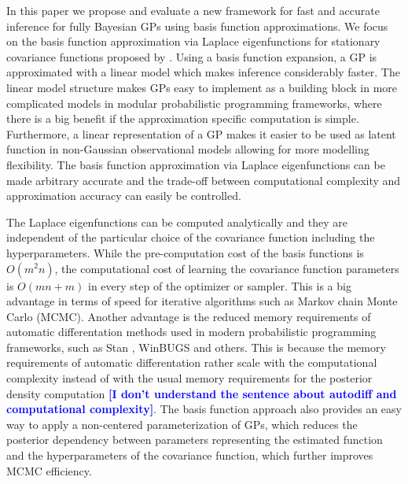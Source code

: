 \documentclass[onecolumn,a4paper,11pt]{article}
\newcommand{\todo}[1]{\textcolor{blue}{\textbf{[#1]}}}
\begin{document}
In this paper we propose and evaluate a new framework for fast and accurate inference for fully Bayesian GPs using basis function approximations. We focus on the basis function approximation via Laplace eigenfunctions for stationary covariance functions proposed by \citet{solin2018hilbert}. Using a basis function expansion, a GP is approximated with a linear model which makes inference considerably faster. The linear model structure makes GPs easy to implement as a building block in more complicated models in modular probabilistic programming frameworks, where there is a big benefit if the approximation specific computation is simple. Furthermore, a linear representation of a GP makes it easier to be used as latent function
in non-Gaussian observational models allowing for more modelling flexibility. The basis function approximation via Laplace eigenfunctions can be made arbitrary accurate and the trade-off between computational complexity and approximation accuracy can easily be controlled.

The Laplace eigenfunctions can be computed analytically and they are independent of the particular choice of the covariance function including the hyperparameters. While the pre-computation cost of the basis functions is $O(m^2n)$, the computational cost of learning the covariance function parameters is $O(mn+m)$ in every step of the optimizer or sampler. This is a big advantage in terms of speed for iterative algorithms such as Markov chain Monte Carlo (MCMC). Another advantage is the reduced memory requirements of automatic differentation methods used in modern probabilistic programming frameworks, such as Stan \citep{carpenter2017stan}, WinBUGS \citep{lunn2000winbugs} and others. This is because the memory requirements of automatic differentation rather scale with the computational complexity instead of with the usual memory requirements for the posterior density computation \todo{I don't understand the sentence about autodiff and computational complexity}. The basis function approach also provides an easy way to apply a non-centered parameterization of GPs, which reduces the posterior dependency between parameters representing the estimated function and the hyperparameters of the covariance function, which further improves MCMC efficiency.

\end{document}
